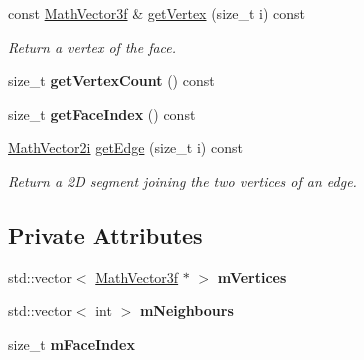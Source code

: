 \begin{DoxyCompactItemize}
\mbox{\label{classvisilib_1_1_silhouette_mesh_face_aa5d81a90731f6b9e96c2881f969890a9}} 
const \mbox{\hyperlink{classvisilib_1_1_math_vector3__}{Math\+Vector3f}} \& \mbox{\hyperlink{classvisilib_1_1_silhouette_mesh_face_aa5d81a90731f6b9e96c2881f969890a9}{get\+Vertex}} (size\+\_\+t i) const
\begin{DoxyCompactList}\small\item\em Return a vertex of the face. \end{DoxyCompactList}\item 
\mbox{\label{classvisilib_1_1_silhouette_mesh_face_a4d7ad0e77adbb4d432eb5710da4f9113}} 
size\+\_\+t {\bfseries get\+Vertex\+Count} () const
\item 
\mbox{\label{classvisilib_1_1_silhouette_mesh_face_a252c5ee227b95f3de5895e354be5c3f1}} 
size\+\_\+t {\bfseries get\+Face\+Index} () const
\item 
\mbox{\label{classvisilib_1_1_silhouette_mesh_face_ab1271ac98b966843331415892e9bce89}} 
\mbox{\hyperlink{classvisilib_1_1_math_vector2__}{Math\+Vector2i}} \mbox{\hyperlink{classvisilib_1_1_silhouette_mesh_face_ab1271ac98b966843331415892e9bce89}{get\+Edge}} (size\+\_\+t i) const
\begin{DoxyCompactList}\small\item\em Return a 2D segment joining the two vertices of an edge. \end{DoxyCompactList}\end{DoxyCompactItemize}
\subsection*{Private Attributes}
\begin{DoxyCompactItemize}
\item 
\mbox{\label{classvisilib_1_1_silhouette_mesh_face_a6c75c0a9bf6324f74d04d97ad1fdba25}} 
std\+::vector$<$ \mbox{\hyperlink{classvisilib_1_1_math_vector3__}{Math\+Vector3f}} $\ast$ $>$ {\bfseries m\+Vertices}
\item 
\mbox{\label{classvisilib_1_1_silhouette_mesh_face_a427e90a6b16744ab6a619c0345436f60}} 
std\+::vector$<$ int $>$ {\bfseries m\+Neighbours}
\item 
\mbox{\label{classvisilib_1_1_silhouette_mesh_face_ac0343e85f9bfda26f25020aa7cc36cec}} 
size\+\_\+t {\bfseries m\+Face\+Index}
\end{DoxyCompactItemize}


